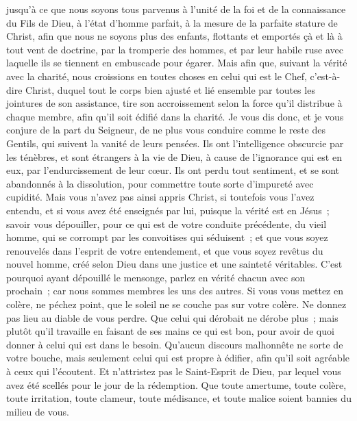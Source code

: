 \begin{multicols}{2}
jusqu'à ce que nous soyons tous parvenus à l'unité de la foi et de la connaissance du Fils de Dieu, à l'état d'homme parfait, à la mesure de la parfaite stature de Christ,
afin que nous ne soyons plus des enfants, flottants et emportés çà et là à tout vent de doctrine, par la tromperie des hommes, et par leur habile ruse avec laquelle ils se tiennent en embuscade pour égarer.
Mais afin que, suivant la vérité avec la charité, nous croissions en toutes choses en celui qui est le Chef, c'est-à-dire Christ,
duquel tout le corps bien ajusté et lié ensemble par toutes les jointures de son assistance, tire son accroissement selon la force qu'il distribue à chaque membre, afin qu'il soit édifié dans la charité.
Je vous dis donc, et je vous conjure de la part du Seigneur, de ne plus vous conduire comme le reste des Gentils, qui suivent la vanité de leurs pensées.
Ils ont l'intelligence obscurcie par les ténèbres, et sont étrangers à la vie de Dieu, à cause de l'ignorance qui est en eux, par l'endurcissement de leur cœur.
Ils ont perdu tout sentiment, et se sont abandonnés à la dissolution, pour commettre toute sorte d'impureté avec cupidité.
Mais vous n'avez pas ainsi appris Christ,
si toutefois vous l'avez entendu, et si vous avez été enseignés par lui, puisque la vérité est en Jésus~; 
savoir vous dépouiller, pour ce qui est de votre conduite précédente, du vieil homme, qui se corrompt par les convoitises qui séduisent~; 
et que vous soyez renouvelés dans l'esprit de votre entendement,
et que vous soyez revêtus du nouvel homme, créé selon Dieu dans une justice et une sainteté véritables.
C'est pourquoi ayant dépouillé le mensonge, parlez en vérité chacun avec son prochain~; car nous sommes membres les uns des autres.
Si vous vous mettez en colère, ne péchez point, que le soleil ne se couche pas sur votre colère.
Ne donnez pas lieu au diable de vous perdre.
Que celui qui dérobait ne dérobe plus~; mais plutôt qu'il travaille en faisant de ses mains ce qui est bon, pour avoir de quoi donner à celui qui est dans le besoin.
Qu'aucun discours malhonnête ne sorte de votre bouche, mais seulement celui qui est propre à édifier, afin qu'il soit agréable à ceux qui l'écoutent.
Et n'attristez pas le Saint-Esprit de Dieu, par lequel vous avez été scellés pour le jour de la rédemption.
Que toute amertume, toute colère, toute irritation, toute clameur, toute médisance, et toute malice soient bannies du milieu de vous.

\end{multicols}
